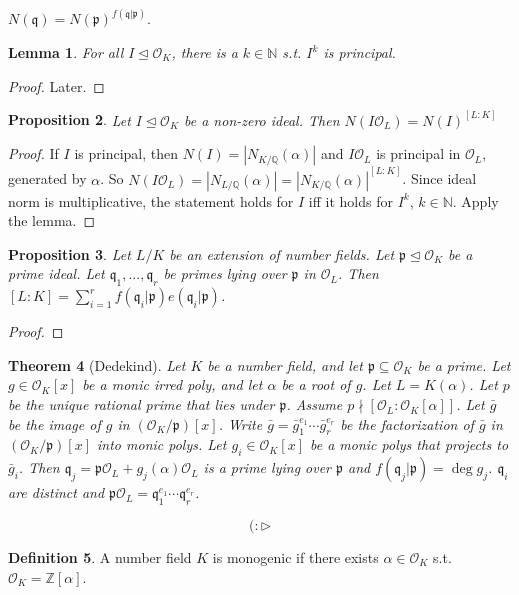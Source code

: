 \documentclass{article}
\theoremstyle{definition}
\newtheorem{defn}{Definition}[section]
\theoremstyle{remark}
\theoremstyle{plain}
\newtheorem{lem}[defn]{Lemma}
\newtheorem{thm}[defn]{Theorem}
\newtheorem{prop}[defn]{Proposition}
\newcommand{\NN}{\mathbb{N}}
\newcommand{\ZZ}{\mathbb{Z}}
\newcommand{\QQ}{\mathbb{Q}}
\begin{document}
$N(\mathfrak q)=N(\mathfrak p)^{f(\mathfrak q|\mathfrak p)}$.

\begin{lem}
    For all $I\trianglelefteq \mathcal O_K$, there is a $k\in\NN$ s.t. $I^k$ is principal.
\end{lem}
\begin{proof}
    Later.
\end{proof}
\begin{prop}
    Let $I\trianglelefteq \mathcal O_K$ be a non-zero ideal. Then $N(I\mathcal O_L)=N(I)^{[L:K]}$
\end{prop}
\begin{proof}
    If $I$ is principal, then $N(I)=|N_{K/\QQ}(\alpha)|$ and $I\mathcal O_L$ is principal in $\mathcal O_L$, generated by $\alpha$. So $N(I\mathcal O_L)=|N_{L/\QQ}(\alpha)|=|N_{K/\QQ}(\alpha)|^{[L:K]}$. Since ideal norm is multiplicative, the statement holds for $I$ iff it holds for $I^k$, $k\in\NN$. Apply the lemma.
\end{proof}
\begin{prop}
    Let $L/K$ be an extension of number fields. Let $\mathfrak p\trianglelefteq \mathcal O_K$ be a prime  ideal. Let $\mathfrak q_1,...,\mathfrak q_r$ be primes lying over $\mathfrak p$ in $\mathcal O_L$. Then $[L:K]=\sum_{i=1}^r f(\mathfrak q_i|\mathfrak p)e(\mathfrak q_i|\mathfrak p)$.
\end{prop}
\begin{proof}
    
\end{proof}
\begin{thm}[Dedekind]
    Let $K$ be a number field, and let $\mathfrak p\subseteq \mathcal O_K$ be a prime. Let $g\in\mathcal O_K[x]$ be a monic irred poly, and let $\alpha$ be a root of $g$. Let $L=K(\alpha)$. Let $p$ be the unique rational prime that lies under $\mathfrak p$. Assume $p\nmid [\mathcal O_L:\mathcal O_K[\alpha]]$. Let $\bar g$ be the image of $g$ in $(\mathcal O_K/\mathfrak p)[x]$. Write $\bar g=\bar g_1^{e_1}\cdots \bar g_r^{e_r}$ be the factorization of $\bar g$ in $(\mathcal O_K/\mathfrak p)[x]$ into monic polys. Let $g_i\in\mathcal O_K[x]$ be a monic polys that projects to $\bar g_i$. Then $\mathfrak q_j=\mathfrak p\mathcal O_L+ g_j(\alpha)\mathcal O_L$ is a prime lying over $\mathfrak p$ and $f(\mathfrak q_j|\mathfrak p)=\deg g_j$. $\mathfrak q_i$ are distinct and $\mathfrak p\mathcal O_L=\mathfrak q_1^{e_1}\cdots\mathfrak q_r^{e_r}$.
\end{thm}
\[(:\triangleright\tag{Owen's signature}\]
\begin{defn}
    A number field $K$ is monogenic if there exists $\alpha\in\mathcal O_K$ s.t. $\mathcal O_K=\ZZ[\alpha]$.
\end{defn}
\end{document}
